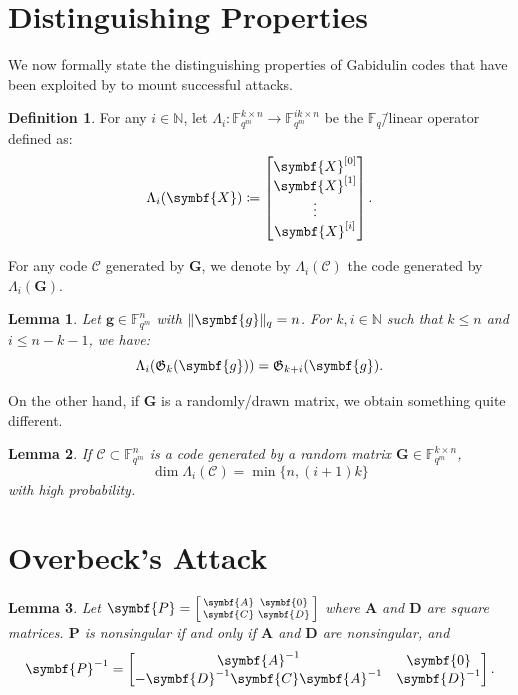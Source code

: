 \documentclass[version=last, paper=A4, parskip=half, oneside,%
toc=bibliography, toc=listof, listof=leveldown]{scrbook}
\theoremstyle{plain}
\newtheorem{lemma}{Lemma}
\theoremstyle{definition}
\newtheorem{definition}{Definition}
\theoremstyle{remark}
\renewcommand*{\vec}{\symbf}
\newcommand*{\mat}{\symbf}
\newcommand*{\FF}{\ensuremath{\mathbb{F}}}
\newcommand*{\NN}{\ensuremath{\mathbb{N}}}
\newcommand*{\Gab}{\ensuremath{\mathfrak{G}}}
\DeclarePairedDelimiter{\norm}{\lVert}{\rVert}
\newcommand*{\normR}[2]{\ensuremath{\norm{#1}_{#2}}}
\begin{document}
\section{Distinguishing Properties}

We now formally state the distinguishing properties of Gabidulin codes that have
been exploited by \textcite{Ove05, Ove06, Ove08} to mount successful attacks.

\begin{definition}
  For any \(i \in \NN\), let
  \(\Lambda_i\colon \FF_{q^m}^{k \times n} \to \FF_{q^m}^{i k \times n}\) be
  the \(\FF_q\)\=/linear operator defined as:
  \[
    \Lambda_i(\mat{X}) \coloneqq
    \begin{bmatrix}
      \mat{X}^{[0]} \\
      \mat{X}^{[1]} \\
      \vdots \\
      \mat{X}^{[i]}
    \end{bmatrix}\text.
  \]
\end{definition}

For any code \(\mathcal{C}\) generated by \(\mat{G}\), we denote by
\(\Lambda_i(\mathcal{C})\) the code generated by \(\Lambda_i(\mat{G})\).

\begin{lemma}
  Let \(\vec{g} \in \FF_{q^m}^n\) with \(\normR{\vec{g}}{q} = n\).  For
  \(k, i \in \NN\) such that \(k \le n\) and \(i \le n - k - 1\), we have:
  \[
    \Lambda_i(\Gab_k(\vec{g})) = \Gab_{k + i}(\vec{g})\text.
  \]
\end{lemma}

On the other hand, if \(\mat{G}\) is a randomly\-/drawn matrix, we obtain
something quite different.

\begin{lemma}
  If \(\mathcal{C} \subset \FF_{q^m}^n\) is a code generated by a random matrix
  \(\mat{G} \in \FF_{q^m}^{k \times n}\),
  \[
    \dim \Lambda_i(\mathcal{C}) = \min\{n, (i + 1) k\}
  \]
  with high probability.
\end{lemma}

\section{Overbeck's Attack}

\begin{lemma}
  Let
  \(\mat{P} = \begin{bsmallmatrix} \mat{A} & \mat{0} \\ \mat{C} & \mat{D} \end{bsmallmatrix}\)
  where \(\mat{A}\) and \(\mat{D}\) are square matrices.  \(\mat{P}\) is
  nonsingular if and only if \(\mat{A}\) and \(\mat{D}\) are nonsingular, and
  \[
    \mat{P}^{-1} =
    \begin{bmatrix}
      \mat{A}^{-1} & \mat{0} \\
      -\mat{D}^{-1} \mat{C} \mat{A}^{-1} & \mat{D}^{-1}
    \end{bmatrix}\text.
  \]
\end{lemma}
\end{document}
